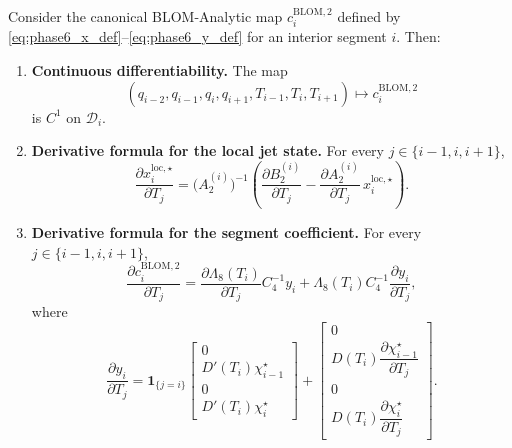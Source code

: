 \begin{proposition}
\label{prop:phase6_time_sensitivity}
Consider the canonical BLOM-Analytic map \(c_i^{\mathrm{BLOM},2}\) defined by
\eqref{eq:phase6_x_def}--\eqref{eq:phase6_y_def} for an interior segment \(i\).
Then:

\begin{enumerate}
    \item \textbf{Continuous differentiability.}
    The map
    \[
    (q_{i-2},q_{i-1},q_i,q_{i+1},T_{i-1},T_i,T_{i+1})
    \longmapsto
    c_i^{\mathrm{BLOM},2}
    \]
    is \(C^1\) on \(\mathcal D_i\).

    \item \textbf{Derivative formula for the local jet state.}
    For every \(j\in\{i-1,i,i+1\}\),
    \begin{equation}
    \label{eq:phase6_dx_dT}
    \frac{\partial x_i^{\mathrm{loc},\star}}{\partial T_j}
    =
    \bigl(A_2^{(i)}\bigr)^{-1}
    \left(
    \frac{\partial B_2^{(i)}}{\partial T_j}
    -
    \frac{\partial A_2^{(i)}}{\partial T_j}\,x_i^{\mathrm{loc},\star}
    \right).
    \end{equation}

    \item \textbf{Derivative formula for the segment coefficient.}
    For every \(j\in\{i-1,i,i+1\}\),
    \begin{equation}
    \label{eq:phase6_dc_dT}
    \frac{\partial c_i^{\mathrm{BLOM},2}}{\partial T_j}
    =
    \frac{\partial \Lambda_8(T_i)}{\partial T_j} C_4^{-1} y_i
    +
    \Lambda_8(T_i) C_4^{-1} \frac{\partial y_i}{\partial T_j},
    \end{equation}
    where
    \begin{equation}
    \label{eq:phase6_dy_dT}
    \frac{\partial y_i}{\partial T_j}
    =
    \mathbf 1_{\{j=i\}}
    \begin{bmatrix}
    0\\ D'(T_i)\chi_{i-1}^\star\\ 0\\ D'(T_i)\chi_i^\star
    \end{bmatrix}
    +
    \begin{bmatrix}
    0\\ D(T_i)\dfrac{\partial \chi_{i-1}^\star}{\partial T_j}\\ 0\\ D(T_i)\dfrac{\partial \chi_i^\star}{\partial T_j}
    \end{bmatrix}.
    \end{equation}


\end{enumerate}
\end{proposition}
